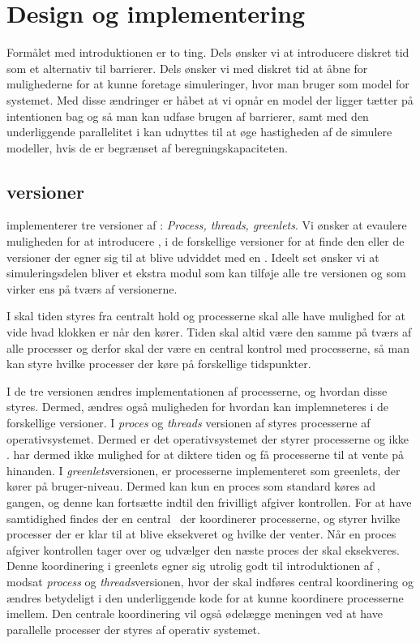 
\section{Design og implementering}
Formålet med introduktionen er to ting. Dels ønsker vi at introducere diskret tid som et alternativ til barrierer. Dels ønsker vi med diskret tid at åbne for mulighederne for at kunne foretage simuleringer, hvor man bruger \csp som model for systemet. Med disse ændringer er håbet at vi opnår en model der ligger tætter på intentionen bag \csp og så man kan udfase brugen af barrierer, samt med den underliggende parallelitet i \csp kan udnyttes til at øge hastigheden af de simulere modeller, hvis de er begrænset af beregningskapaciteten.

\subsection{\pycsp versioner}
\pycsp implementerer tre versioner af \csp: \emph{Process, threads, greenlets}\cite{Friborg2009}. Vi ønsker at evaulere muligheden for at introducere \des, i de forskellige versioner for at finde den eller de versioner der egner sig til at blive  udviddet med en \des. Ideelt set ønsker vi at simuleringsdelen bliver et ekstra modul som kan tilføje alle tre versionen og som virker ens på tværs af versionerne.  

I \des  skal tiden styres fra centralt hold og processerne skal alle have mulighed for at vide hvad klokken er når den kører. Tiden skal altid være den samme på tværs af alle processer og derfor skal der være en central kontrol med processerne, så man kan styre hvilke processer der køre på forskellige tidspunkter.

I de tre versionen ændres implementationen af processerne, og hvordan disse styres.  Dermed, ændres også muligheden for hvordan \des kan implemneteres i de forskellige versioner. I  \emph{proces} og \emph{threads} versionen af \pycsp styres processerne af operativsystemet. Dermed er det operativsystemet der styrer processerne og ikke \pycsp.  \pycsp har dermed ikke mulighed for at diktere tiden og få processerne til at vente på hinanden. I \emph{greenlets}versionen, er processerne implementeret som greenlets, der kører  på bruger-niveau. Dermed kan kun en proces som standard køres ad gangen, og denne kan fortsætte indtil den frivilligt afgiver kontrollen. For at have samtidighed findes der en central \sched ~der koordinerer processerne, og styrer hvilke processer der er klar til at blive eksekveret og hvilke der venter. Når en proces afgiver kontrollen tager \sched over og udvælger den næste proces der skal eksekveres. Denne koordinering i greenlets egner sig utrolig godt til introduktionen af \des, modsat \emph{process} og \emph{threads}versionen, hvor der skal indføres central koordinering og ændres betydeligt i den underliggende kode for at kunne koordinere processerne imellem. Den centrale koordinering vil også ødelægge meningen ved at have parallelle processer der styres af operativ systemet.

